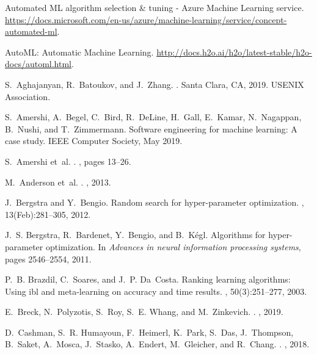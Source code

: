 \documentclass[11pt,dvipdfmx]{article}
\begin{document}
{\small
\begin{thebibliography}{10}

{Automated ML algorithm selection \& tuning - Azure Machine Learning service}.
\newblock
  \url{https://docs.microsoft.com/en-us/azure/machine-learning/service/concept-automated-ml}.

{AutoML: Automatic Machine Learning}.
\newblock \url{http://docs.h2o.ai/h2o/latest-stable/h2o-docs/automl.html}.

S.~Aghajanyan, R.~Batoukov, and J.~Zhang.
.
\newblock Santa Clara, CA, 2019. {USENIX} Association.

S.~Amershi, A.~Begel, C.~Bird, R.~DeLine, H.~Gall, E.~Kamar, N.~Nagappan,
  B.~Nushi, and T.~Zimmermann.
\newblock Software engineering for machine learning: A case study.
\newblock IEEE Computer Society, May 2019.

S.~Amershi et~al.
.
, pages 13--26.

M.~Anderson et~al.
.
, 2013.

J.~Bergstra and Y.~Bengio.
\newblock Random search for hyper-parameter optimization.
, 13(Feb):281--305, 2012.

J.~S. Bergstra, R.~Bardenet, Y.~Bengio, and B.~K{\'e}gl.
\newblock Algorithms for hyper-parameter optimization.
\newblock In {\em Advances in neural information processing systems}, pages
  2546--2554, 2011.

P.~B. Brazdil, C.~Soares, and J.~P. Da~Costa.
\newblock Ranking learning algorithms: Using ibl and meta-learning on accuracy
  and time results.
, 50(3):251--277, 2003.

E.~Breck, N.~Polyzotis, S.~Roy, S.~E. Whang, and M.~Zinkevich.
.
, 2019.

D.~Cashman, S.~R. Humayoun, F.~Heimerl, K.~Park, S.~Das, J.~Thompson, B.~Saket,
  A.~Mosca, J.~Stasko, A.~Endert, M.~Gleicher, and R.~Chang.
.
, 2018.


\end{thebibliography}}
\end{document}
